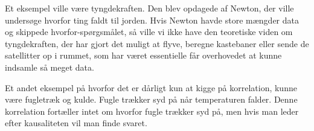 Et eksempel ville være tyngdekraften. Den blev opdagede af Newton, der ville undersøge hvorfor ting faldt til jorden. Hvis Newton havde store mængder data og skippede hvorfor-spørgsmålet, så ville vi ikke have den teoretiske viden om tyngdekraften, der har gjort det muligt at flyve, beregne kastebaner eller sende de satellitter op i rummet, som har været essentielle får overhovedet at kunne indsamle så meget data. 

Et andet eksempel på hvorfor det er dårligt kun at kigge på korrelation, kunne være fugletræk og kulde. Fugle trækker syd på når temperaturen falder. Denne korrelation fortæller intet om hvorfor fugle trækker syd på, men hvis man leder efter kausaliteten vil man finde svaret.